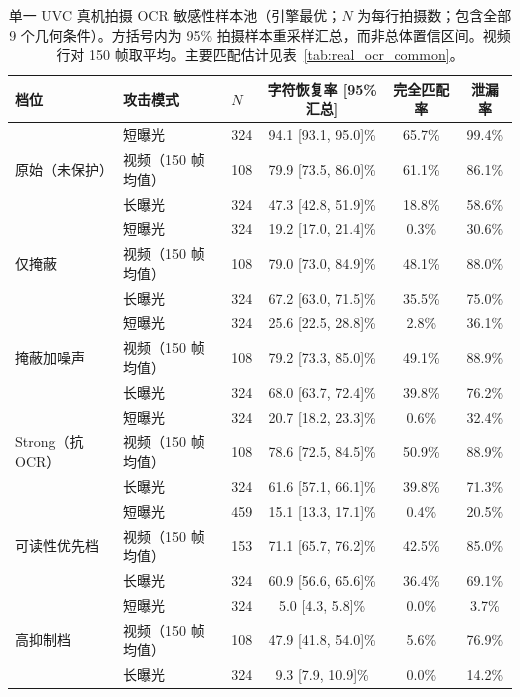 \begin{table}[!t]
\caption{单一 UVC 真机拍摄 OCR 敏感性样本池（引擎最优；$N$ 为每行拍摄数；包含全部 9 个几何条件）。方括号内为 95\% 拍摄样本重采样汇总，而非总体置信区间。视频行对 150 帧取平均。主要匹配估计见表~\ref{tab:real_ocr_common}。}
\label{tab:real_ocr_full_pool}
\centering
\footnotesize
\begin{tabular}{lllccc}
\toprule
档位 & 攻击模式 & $N$ & 字符恢复率 [95\% 汇总] & 完全匹配率 & 泄漏率 \\
\midrule
\multirow{3}{*}{原始（未保护）}
 & 短曝光 & 324 & 94.1 [93.1, 95.0]\% & 65.7\% & 99.4\% \\
 & 视频（150 帧均值） & 108 & 79.9 [73.5, 86.0]\% & 61.1\% & 86.1\% \\
 & 长曝光 & 324 & 47.3 [42.8, 51.9]\% & 18.8\% & 58.6\% \\
\midrule
\multirow{3}{*}{仅掩蔽}
 & 短曝光 & 324 & 19.2 [17.0, 21.4]\% & 0.3\% & 30.6\% \\
 & 视频（150 帧均值） & 108 & 79.0 [73.0, 84.9]\% & 48.1\% & 88.0\% \\
 & 长曝光 & 324 & 67.2 [63.0, 71.5]\% & 35.5\% & 75.0\% \\
\midrule
\multirow{3}{*}{掩蔽加噪声}
 & 短曝光 & 324 & 25.6 [22.5, 28.8]\% & 2.8\% & 36.1\% \\
 & 视频（150 帧均值） & 108 & 79.2 [73.3, 85.0]\% & 49.1\% & 88.9\% \\
 & 长曝光 & 324 & 68.0 [63.7, 72.4]\% & 39.8\% & 76.2\% \\
\midrule
\multirow{3}{*}{Strong（抗 OCR）}
 & 短曝光 & 324 & 20.7 [18.2, 23.3]\% & 0.6\% & 32.4\% \\
 & 视频（150 帧均值） & 108 & 78.6 [72.5, 84.5]\% & 50.9\% & 88.9\% \\
 & 长曝光 & 324 & 61.6 [57.1, 66.1]\% & 39.8\% & 71.3\% \\
\midrule
\multirow{3}{*}{可读性优先档}
 & 短曝光 & 459 & 15.1 [13.3, 17.1]\% & 0.4\% & 20.5\% \\
 & 视频（150 帧均值） & 153 & 71.1 [65.7, 76.2]\% & 42.5\% & 85.0\% \\
 & 长曝光 & 324 & 60.9 [56.6, 65.6]\% & 36.4\% & 69.1\% \\
\midrule
\multirow{3}{*}{高抑制档}
 & 短曝光 & 324 & 5.0 [4.3, 5.8]\% & 0.0\% & 3.7\% \\
 & 视频（150 帧均值） & 108 & 47.9 [41.8, 54.0]\% & 5.6\% & 76.9\% \\
 & 长曝光 & 324 & 9.3 [7.9, 10.9]\% & 0.0\% & 14.2\% \\
\bottomrule
\end{tabular}
\end{table}

